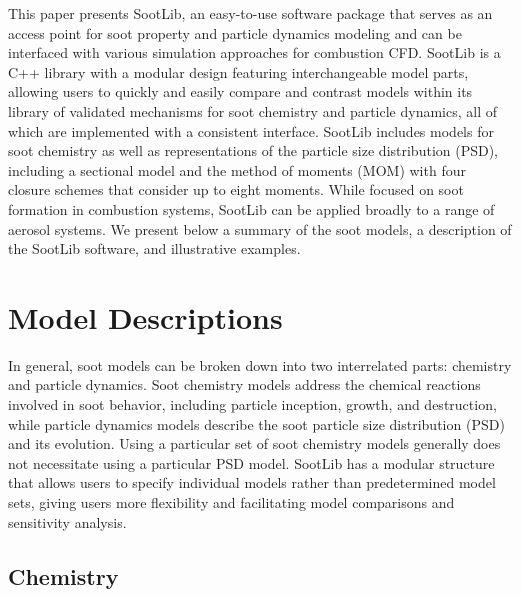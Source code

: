 \documentclass[preprint,letterpaper]{elsarticle}
\begin{document}
This paper presents SootLib, an easy-to-use software package that serves as an access point for soot property and particle dynamics modeling and can be interfaced with various simulation approaches for combustion CFD.
SootLib is a C++ library with a modular design featuring interchangeable model parts, allowing users to quickly and easily compare and contrast models within its library of validated mechanisms for soot chemistry and particle dynamics, all of which are implemented with a consistent interface.
SootLib includes models for soot chemistry as well as representations of the particle size distribution (PSD), including a sectional model and the method of moments (MOM) with four closure schemes that consider up to eight moments.
While focused on soot formation in combustion systems, SootLib can be applied broadly to a range of aerosol systems.
We present below a summary of the soot models, a description of the SootLib software, and illustrative examples.


\section{Model Descriptions}
\label{s:models}

In general, soot models can be broken down into two interrelated parts: chemistry and particle dynamics.
Soot chemistry models address the chemical reactions involved in soot behavior, including particle inception, growth, and destruction, while particle dynamics models describe the soot particle size distribution (PSD) and its evolution.
Using a particular set of soot chemistry models generally does not necessitate using a particular PSD model.
SootLib has a modular structure that allows users to specify individual models rather than predetermined model sets, giving users more flexibility and facilitating model comparisons and sensitivity analysis.

\subsection{Chemistry}
\label{s:chemistry}
\end{document}
